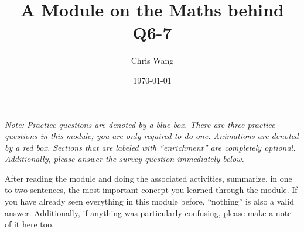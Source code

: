 \documentclass{article}
\title{A Module on the Maths behind Q6-7}
\author{Chris Wang}
\date{\today}
\begin{document}
\maketitle

\textit{Note: Practice questions are denoted by a blue box. There are three practice questions in this module; you are only required to do one. Animations are denoted by a red box. Sections that are labeled with ``enrichment'' are completely optional. Additionally, please answer the survey question immediately below.}

\begin{tcolorbox}[arc=2mm, colback=green!10!white, colframe=green!50!black, title=\textsc{Survey Question}]
	After reading the module and doing the associated activities, summarize, in one to two sentences, the most important concept you learned through the module. If you have already seen everything in this module before, ``nothing'' is also a valid answer. Additionally, if anything was particularly confusing, please make a note of it here too.
\end{tcolorbox}





    
\end{document}
